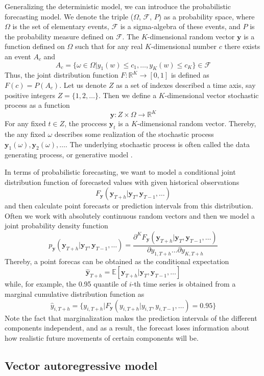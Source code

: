 \documentclass[12pt,a4paper]{article}
\begin{document}
Generalizing the deterministic model, we can introduce the probabilistic forecasting model. We denote the triple ($\Omega$, $\mathcal F$, $P$) as a probability space, where $\Omega$ is the set of elementary events, $\mathcal F$ is a sigma-algebra of these events, and $P$ is the probability measure defined on $\mathcal F$. The $K$-dimensional random vector $\mathbf y$ is a function defined on $\Omega$ such that for any real $K$-dimensional number $c$ there exists an event $A_c$ and
$$A_c = \{ \omega \in \Omega | y_1(w)\leq c_1, \dots, y_K(w) \leq c_K\} \in \mathcal F$$
Thus, the joint distribution function $F: \mathbb R^K \to[0, 1]$ is defined as $F(c)=P(A_c)$. Let us denote $Z$ as a set of indexes described a time axis, say positive integers $Z = \{1, 2, \dots\}$. Then we define a $K$-dimensional vector stochastic process as a function 
$$\mathbf y: Z \times \Omega \to \mathbb R^K$$
For any fixed $t \in Z$, the proccess $\mathbf y_t$ is a $K$-dimensional random vector. Thereby, the any fixed $\omega$ describes some realization of the stochastic process $\mathbf y_1(\omega), \mathbf y_2(\omega), \dots$. The underlying stochastic process is often called the data generating process, or generative model \cite{mts2007}.

In terms of probabilistic forecasting, we want to model a conditional joint distribution function of forecasted values with given historical observations
$$F_\mathbf{y}(\mathbf y_{T+h} | \mathbf y_{T}, \mathbf y_{T-1}, \dots)$$
and then calculate point forecasts or prediction intervals from this distribution. Often we work with absolutely continuous random vectors and then we model a joint probability density function
$$p_\mathbf{y}(\mathbf y_{T+h} | \mathbf y_{T}, \mathbf y_{T-1}, \dots) = \frac{\partial^K F_\mathbf{y}(\mathbf y_{T+h} | \mathbf y_{T}, \mathbf y_{T-1}, \dots)}{\partial y_{1, T+h}\dots\partial y_{K, T+h}}$$
Thereby, a point forecas can be obtained as the conditional expectation
$$\hat{\mathbf y}_{T+h} = \mathbb E[\mathbf y_{T+h} | \mathbf y_{T}, \mathbf y_{T-1}, \dots]$$
while, for example, the 0.95 quantile of $i$-th time series is obtained from a marginal cumulative distribution function as
$$\hat{y}_{i, T+h} = \{ y_{i, T+h} | F_\mathbf{y}(y_{i, T+h} | y_{i, T}, y_{i, T-1}, \dots) = 0.95 \}$$
Note the fact that marginalization makes the prediction intervals of the different components independent, and as a result, the forecast loses information about how realistic future movements of certain components will be.

\subsection{Vector autoregressive model}
\end{document}
